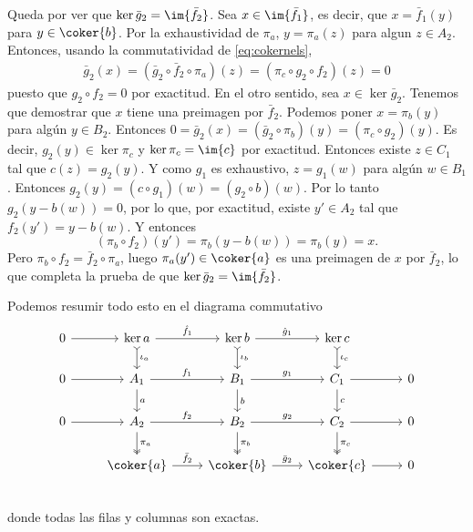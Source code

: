 \documentclass[12pt]{article}
\begin{document}
Queda por ver que \( \ker{\bar{g}_2} = \im{\bar{f}_2} \). Sea \( x \in \im{\bar{f}_1} \),
es decir, que \( x = \bar{f}_1(y) \) para \( y \in \coker{b} \). Por la exhaustividad de
\( \pi_a \), \( y = \pi_a(z) \) para algun \( z \in A_2 \). Entonces, usando la
commutatividad de \eqref{eq:cokernels},
\begin{align*}
	\bar{g}_2 (x) = (\bar{g}_2 \circ \bar{f}_2 \circ \pi_a)(z) = (\pi_c \circ g_2 \circ
	f_2)(z) = 0
\end{align*}
puesto que \( g_2 \circ f_2 = 0 \) por exactitud. En el otro sentido, sea \( x \in
\ker{\bar{g}_2} \). Tenemos que demostrar que \( x \) tiene una preimagen por \(
\bar{f}_2 \). Podemos poner \( x = \pi_b(y) \) para algún \( y \in B_2 \). Entonces \(
0 = \bar{g}_2(x) = (\bar{g}_2 \circ \pi_b)(y) = (\pi_c \circ g_2)(y) \). Es decir, \( g_2(y) \in
\ker{\pi_c} \) y \( \ker{\pi_c} = \im{c} \) por exactitud. Entonces existe \( z \in C_1 \)
tal que \( c(z) = g_2(y) \). Y como \( g_1 \) es exhaustivo, \( z = g_1(w) \) para algún
\( w \in B_1 \). Entonces \( g_2(y) = (c \circ g_1)(w) = (g_2 \circ b)(w) \). Por lo tanto
\( g_2(y - b(w)) = 0 \), por lo que, por exactitud, existe \( y' \in A_2 \) tal que \(
f_2(y') = y - b(w) \). Y entonces
\begin{equation*}
	(\pi_b \circ f_2)(y') = \pi_b(y - b(w)) = \pi_b(y) = x.
\end{equation*}
Pero \( \pi_b \circ f_2 = \bar{f}_2 \circ \pi_a \), luego \( \pi_a(y') \in \coker{a} \) es
una preimagen de \( x \) por \( \bar{f}_2 \), lo que completa la prueba de que \(
\ker{\bar{g}_2} = \im{\bar{f}_2} \).

Podemos resumir todo esto en el diagrama commutativo
\begin{equation*}
	\begin{tikzcd}
		0 \arrow[r] & \ker{a} \arrow[d, "\iota_a", tail] \arrow[r, "\hat{f}_1"] & \ker{b} \arrow[d,
		"\iota_b", tail] \arrow[r, "\hat{g}_1"] & \ker{c}
		\arrow[d, "\iota_c", tail] \\
		0 \arrow[r] & A_1 \arrow[r, "f_1"] \arrow[d, "a"] & B_1 \arrow[r, "g_1"] \arrow[d, "b"] & C_1
		\arrow[r] \arrow[d, "c"] & 0 \\
		0 \arrow[r] & A_2 \arrow[r, "f_2"] \arrow[d, "\pi_a", two heads] & B_2 \arrow[r,
		"g_2"] \arrow[d, "\pi_b", two heads] & C_2 \arrow[r] \arrow[d, "\pi_c", two heads] & 0
		\\
																				 & \coker{a} \arrow[r, "\bar{f}_2"] &
		\coker{b} \arrow[r, "\bar{g}_2"]  & \coker{c} \arrow[r] & 0 \\
	\end{tikzcd}
\end{equation*}
donde todas las filas y columnas son exactas.
\end{document}
